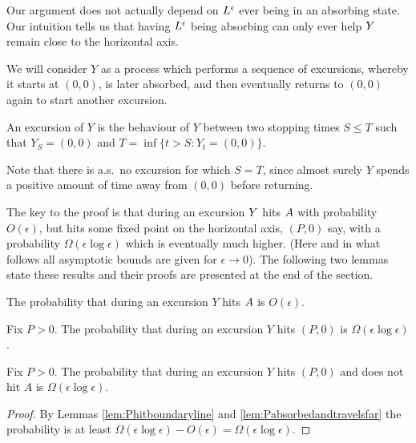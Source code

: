 {Our argument does not actually depend on $L^\epsilon$ ever being in an
absorbing state.  Our intuition tells us that having $L^\epsilon$ being
absorbing can only ever help $Y$ remain close to the horizontal
axis.

\newcommand{\farpoint}{(P,0)}
\newcommand{\origin}{(0,0)}

We will consider $Y$ as a process which performs a sequence of
excursions, whereby it starts at $\origin$, is later absorbed, and
then eventually returns to $\origin$ again to start another excursion.

\begin{definition}
  An excursion of $Y$ is the behaviour of $Y$ between two stopping times
  $S \le T$ such that $Y_S =
  \origin$ and $T = \inf\{ t > S : Y_t = \origin \}$.
\end{definition}

Note that there is a.s.\ no excursion for which $S = T$, since almost
surely $Y$ spends a positive amount of time away from $\origin$ before
returning.

\newcommand{\Omegaeloge}{\Omega(\epsilon\log\epsilon)}

The key to the proof is that during an excursion $Y$ hits
$A$ with probability $O(\epsilon)$, but hits some fixed
point on the horizontal axis, $\farpoint$ say, with a probability
$\Omegaeloge$ which is eventually much higher.  (Here and in what
follows all asymptotic bounds are given for $\epsilon \to 0$).
The following two
lemmas state these results and their proofs are presented at the end
of the section.

\begin{lemma}
  \label{lem:Phitboundaryline}
  The probability that during an excursion $Y$ hits $A$
  is $O(\epsilon)$.
\end{lemma}

\begin{lemma}
  \label{lem:Pabsorbedandtravelsfar}
  Fix $P > 0$.  The probability that during an excursion $Y$ hits $\farpoint$
  is $\Omegaeloge$.
\end{lemma}

\begin{lemma}
  Fix $P > 0$.  The probability that during an excursion $Y$ hits $\farpoint$
  and does not hit $A$ is $\Omegaeloge$.
\end{lemma}

\begin{proof}
  By Lemmas \ref{lem:Phitboundaryline} and
  \ref{lem:Pabsorbedandtravelsfar} the probability is at least
  $\Omegaeloge - O(\epsilon) = \Omegaeloge$.
\end{proof}

}
